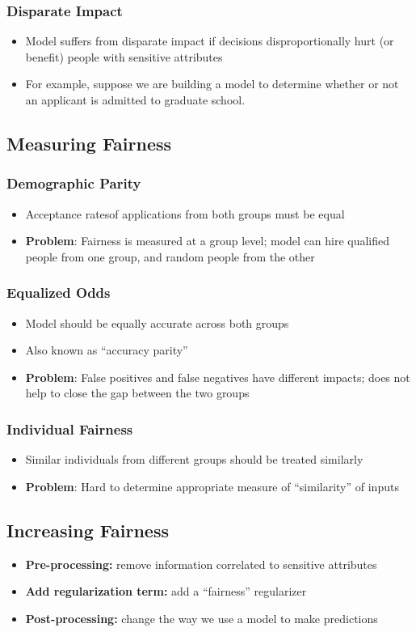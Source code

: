 \documentclass[11pt]{article}
\begin{document}
\subsubsection{Disparate Impact}
\begin{itemize}
\item Model suffers from disparate impact if decisions disproportionally hurt (or benefit) people with sensitive attributes
\item For example, suppose we are building a model to determine whether or not an applicant is admitted to graduate school.
\end{itemize}

\subsection{Measuring Fairness }
\subsubsection{Demographic Parity }
\begin{itemize}
\item Acceptance ratesof applications from both groups must be equal
\item \textbf{Problem}: Fairness is measured at a group level; 
model can hire qualified people from one group, and random people from the other
\end{itemize}
\subsubsection{Equalized Odds }
\begin{itemize}
\item Model should be equally accurate across both groups
\item Also known as “accuracy parity”
\item \textbf{Problem}: False positives and false negatives have different impacts; does not help to close the gap between the two groups
\end{itemize}
\subsubsection{Individual Fairness }
\begin{itemize}
\item Similar individuals from different groups should be treated similarly
\item \textbf{Problem}: Hard to determine appropriate measure of “similarity” of inputs
\end{itemize}

\subsection{Increasing Fairness}
\begin{itemize}
\item \textbf{Pre-processing:} remove information correlated to sensitive attributes
\item \textbf{Add regularization term:} add a “fairness” regularizer
\item \textbf{Post-processing:} change the way we use a model to make predictions
\end{itemize}
\end{document}
